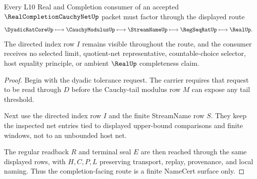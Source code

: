 \begin{theorem}
\label{thm:real-completion-cauchy-net-completion-facing-route}
Every L10 Real and Completion consumer of an accepted $\RealCompletionCauchyNetUp$ packet must factor through the displayed route
$$
\DyadicRatCoreUp
\longmapsto
\CauchyModulusUp
\longmapsto
\StreamNameUp
\longmapsto
\RegSeqRatUp
\longmapsto
\RealUp .
$$
The directed index row $I$ remains visible throughout the route, and the consumer receives no selected limit, quotient-net representative, countable-choice selector, host equality principle, or ambient $\RealUp$ completeness claim.
\end{theorem}
\begin{proof}
Begin with the dyadic tolerance request. The carrier requires that request to be read through $D$ before the Cauchy-tail modulus row $M$ can expose any tail threshold.

Next use the directed index row $I$ and the finite StreamName row $S$. They keep the inspected net entries tied to displayed upper-bound comparisons and finite windows, not to an unbounded host net.

The regular readback $R$ and terminal seal $E$ are then reached through the same displayed rows, with $H,C,P,L$ preserving transport, replay, provenance, and local naming. Thus the completion-facing route is a finite NameCert surface only.
\end{proof}



